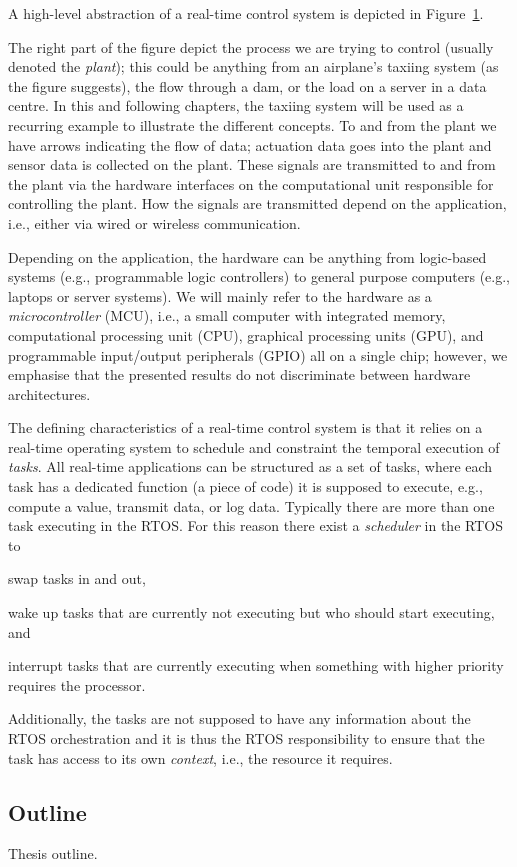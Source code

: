 A high-level abstraction of a real-time control system is depicted in Figure~\ref{fig:high-level-abstraction}.
%
\begin{figure}[t]
    \centering
    \caption{}%
    \label{fig:high-level-abstraction}%
\end{figure}
The right part of the figure depict the process we are trying to control (usually denoted the \emph{plant}); this could be anything from an airplane's taxiing system (as the figure suggests), the flow through a dam, or the load on a server in a data centre.
In this and following chapters, the taxiing system will be used as a recurring example to illustrate the different concepts.
To and from the plant we have arrows indicating the flow of data; actuation data goes into the plant and sensor data is collected on the plant.
These signals are transmitted to and from the plant via the hardware interfaces on the computational unit responsible for controlling the plant.
How the signals are transmitted depend on the application, i.e., either via wired or wireless communication.

Depending on the application, the hardware can be anything from logic-based systems (e.g., programmable logic controllers) to general purpose computers (e.g., laptops or server systems).
We will mainly refer to the hardware as a \emph{microcontroller} (MCU), i.e., a small computer with integrated memory, computational processing unit (CPU), graphical processing units (GPU), and programmable input/output peripherals (GPIO) all on a single chip; however, we emphasise that the presented results do not discriminate between hardware architectures.

The defining characteristics of a real-time control system is that it relies on a real-time operating system to schedule and constraint the temporal execution of \emph{tasks}.
All real-time applications can be structured as a set of tasks, where each task has a dedicated function (a piece of code) it is supposed to execute, e.g., compute a value, transmit data, or log data.
Typically there are more than one task executing in the RTOS.
For this reason there exist a \emph{scheduler} in the RTOS to
\begin{enumerate*}[label=(\roman*)]
    \item swap tasks in and out,
    \item wake up tasks that are currently not executing but who should start executing, and
    \item interrupt tasks that are currently executing when something with higher priority requires the processor.
\end{enumerate*}
Additionally, the tasks are not supposed to have any information about the RTOS orchestration and it is thus the RTOS responsibility to ensure that the task has access to its own \emph{context}, i.e., the resource it requires. 






\subsection*{Outline}%
%
Thesis outline.
